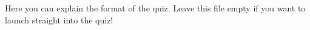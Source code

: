 \begin{frame}
   Here you can explain the format of the quiz. Leave this file empty if you want to launch straight into the quiz!
\end{frame}